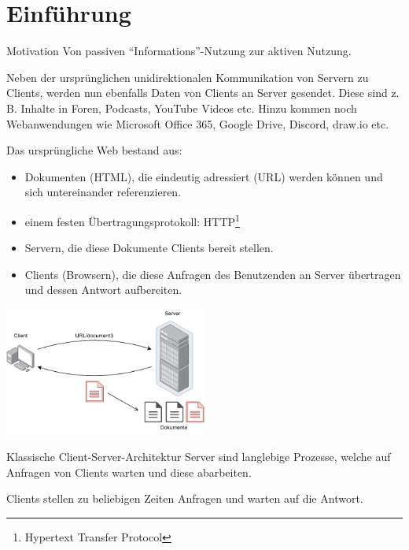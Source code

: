 \section{Einführung}

\begin{bonus}{Motivation}
    Von passiven \enquote{Informations}-Nutzung zur aktiven Nutzung.

    Neben der ursprünglichen unidirektionalen Kommunikation von Servern zu Clients, werden nun ebenfalls Daten von Clients an Server gesendet.
    Diese sind z. B. Inhalte in Foren, Podcasts, YouTube Videos etc.
    Hinzu kommen noch Webanwendungen wie Microsoft Office 365, Google Drive, Discord, draw.io etc.

    Das ursprüngliche Web bestand aus:
    \begin{itemize}
        \item Dokumenten (HTML), die eindeutig adressiert (URL) werden können und sich untereinander referenzieren.
        \item einem festen Übertragungsprotokoll: HTTP\footnote{Hypertext Transfer Protocol}
        \item Servern, die diese Dokumente Clients bereit stellen.
        \item Clients (Browsern), die diese Anfragen des Benutzenden an Server übertragen und dessen Antwort aufbereiten.
    \end{itemize}

    \begin{center}
        \includegraphics[width=0.5\textwidth]{includes/figures/bonus_original_web.pdf}
    \end{center}
\end{bonus}

\begin{bonus}{Klassische Client-Server-Architektur}
    Server sind langlebige Prozesse, welche auf Anfragen von Clients warten und diese abarbeiten.

    Clients stellen zu beliebigen Zeiten Anfragen und warten auf die Antwort.
\end{bonus}

